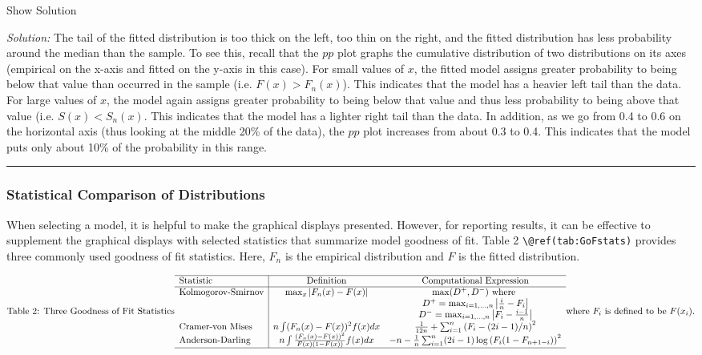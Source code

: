 \documentclass[]{book}
\theoremstyle{definition}
\theoremstyle{definition}
\theoremstyle{definition}
\theoremstyle{remark}
\begin{document}
Show Solution

\hypertarget{toggleExamC59}{}
\emph{Solution:} The tail of the fitted distribution is too thick on the
left, too thin on the right, and the fitted distribution has less
probability around the median than the sample. To see this, recall that
the \(pp\) plot graphs the cumulative distribution of two distributions
on its axes (empirical on the x-axis and fitted on the y-axis in this
case). For small values of \(x\), the fitted model assigns greater
probability to being below that value than occurred in the sample (i.e.
\(F(x) > F_n(x)\)). This indicates that the model has a heavier left
tail than the data. For large values of \(x\), the model again assigns
greater probability to being below that value and thus less probability
to being above that value (i.e. \(S(x) < S_n(x)\). This indicates that
the model has a lighter right tail than the data. In addition, as we go
from 0.4 to 0.6 on the horizontal axis (thus looking at the middle 20\%
of the data), the \(pp\) plot increases from about 0.3 to 0.4. This
indicates that the model puts only about 10\% of the probability in this
range.

\begin{center}\rule{0.5\linewidth}{\linethickness}\end{center}

\subsubsection{Statistical Comparison of
Distributions}\label{statistical-comparison-of-distributions}

When selecting a model, it is helpful to make the graphical displays
presented. However, for reporting results, it can be effective to
supplement the graphical displays with selected statistics that
summarize model goodness of fit. Table 2
\texttt{\textbackslash{}@ref(tab:GoFstats)} provides three commonly used
goodness of fit statistics. Here, \(F_n\) is the empirical distribution
and \(F\) is the fitted distribution.

\[\text{Table 2: Three Goodness of Fit Statistics} \\
\begin{array}{l|cc}
\hline
\text{Statistic} & \text{Definition} & \text{Computational Expression} \\
\hline 
\text{Kolmogorov-Smirnov} & \max_x |F_n(x) - F(x)| & \max(D^+, D^-) \text{ where } \\
&& D^+ = \max_{i=1, \ldots, n} \left|\frac{i}{n} - F_i\right| \\
&& D^- = \max_{i=1, \ldots, n} \left| F_i - \frac{i-1}{n} \right| \\
\text{Cramer-von Mises} & n \int (F_n(x) - F(x))^2 f(x) dx & \frac{1}{12n} + \sum_{i=1}^n \left(F_i - (2i-1)/n\right)^2 \\
\text{Anderson-Darling} & n \int \frac{(F_n(x) - F(x))^2}{F(x)(1-F(x))} f(x) dx & -n-\frac{1}{n} \sum_{i=1}^n (2i-1) \log\left(F_i(1-F_{n+1-i})\right)^2 \\
\hline
\end{array} \\
\text{where } F_i \text{ is defined to be } F(x_i).\]
\end{document}
